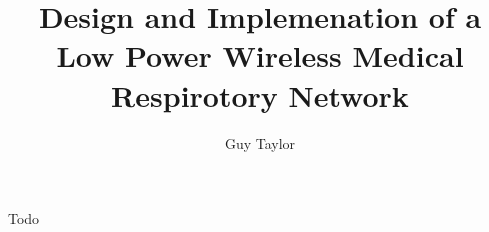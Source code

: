 \documentclass[bsc,logo,plainprepages,parskip,abbrevs,10pt]{infthesis}
\title{Design and Implemenation of a Low Power Wireless Medical Respirotory Network}
\author{Guy Taylor}
\begin{document}
\begin{preliminary}

\maketitle

\begin{acknowledgements}
  Todo
\end{acknowledgements}

\standarddeclaration

\tableofcontents


\end{preliminary}






\appendix







\end{document}
